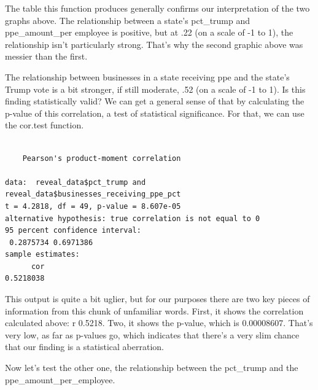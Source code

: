 \documentclass[
  letterpaper,
  DIV=11,
  numbers=noendperiod]{scrreprt}
\newenvironment{Shaded}{\begin{snugshade}}{\end{snugshade}}
\newcommand{\FunctionTok}[1]{\textcolor[rgb]{0.28,0.35,0.67}{#1}}
\newcommand{\NormalTok}[1]{\textcolor[rgb]{0.00,0.23,0.31}{#1}}
\newcommand{\SpecialCharTok}[1]{\textcolor[rgb]{0.37,0.37,0.37}{#1}}
\begin{document}
The table this function produces generally confirms our interpretation
of the two graphs above. The relationship between a state's pct\_trump
and ppe\_amount\_per employee is positive, but at .22 (on a scale of -1
to 1), the relationship isn't particularly strong. That's why the second
graphic above was messier than the first.

The relationship between businesses in a state receiving ppe and the
state's Trump vote is a bit stronger, if still moderate, .52 (on a scale
of -1 to 1). Is this finding statistically valid? We can get a general
sense of that by calculating the p-value of this correlation, a test of
statistical significance. For that, we can use the cor.test function.

\begin{Shaded}
\end{Shaded}

\begin{verbatim}

    Pearson's product-moment correlation

data:  reveal_data$pct_trump and reveal_data$businesses_receiving_ppe_pct
t = 4.2818, df = 49, p-value = 8.607e-05
alternative hypothesis: true correlation is not equal to 0
95 percent confidence interval:
 0.2875734 0.6971386
sample estimates:
      cor 
0.5218038 
\end{verbatim}

This output is quite a bit uglier, but for our purposes there are two
key pieces of information from this chunk of unfamiliar words. First, it
shows the correlation calculated above: r 0.5218. Two, it shows the
p-value, which is 0.00008607. That's very low, as far as p-values go,
which indicates that there's a very slim chance that our finding is a
statistical aberration.

Now let's test the other one, the relationship between the pct\_trump
and the ppe\_amount\_per\_employee.

\begin{Shaded}
\end{Shaded}
\end{document}
